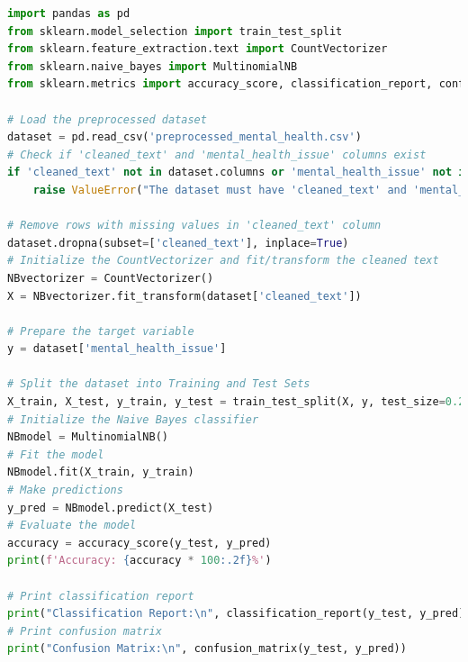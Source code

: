 \begin{tcolorbox}[colback=gray!5!white, colframe=gray!80!black, boxrule=0.5pt, title=Naive Bayes for Mental Health Classification]
    \begin{lstlisting}[language=Python]
import pandas as pd
from sklearn.model_selection import train_test_split
from sklearn.feature_extraction.text import CountVectorizer
from sklearn.naive_bayes import MultinomialNB
from sklearn.metrics import accuracy_score, classification_report, confusion_matrix

# Load the preprocessed dataset
dataset = pd.read_csv('preprocessed_mental_health.csv')
# Check if 'cleaned_text' and 'mental_health_issue' columns exist
if 'cleaned_text' not in dataset.columns or 'mental_health_issue' not in dataset.columns:
    raise ValueError("The dataset must have 'cleaned_text' and 'mental_health_issue' columns.")

# Remove rows with missing values in 'cleaned_text' column
dataset.dropna(subset=['cleaned_text'], inplace=True)
# Initialize the CountVectorizer and fit/transform the cleaned text
NBvectorizer = CountVectorizer()
X = NBvectorizer.fit_transform(dataset['cleaned_text'])

# Prepare the target variable
y = dataset['mental_health_issue']

# Split the dataset into Training and Test Sets
X_train, X_test, y_train, y_test = train_test_split(X, y, test_size=0.2, random_state=42)
# Initialize the Naive Bayes classifier
NBmodel = MultinomialNB()
# Fit the model
NBmodel.fit(X_train, y_train)
# Make predictions
y_pred = NBmodel.predict(X_test)
# Evaluate the model
accuracy = accuracy_score(y_test, y_pred)
print(f'Accuracy: {accuracy * 100:.2f}%')

# Print classification report
print("Classification Report:\n", classification_report(y_test, y_pred))
# Print confusion matrix
print("Confusion Matrix:\n", confusion_matrix(y_test, y_pred))
    \end{lstlisting}
\end{tcolorbox}

